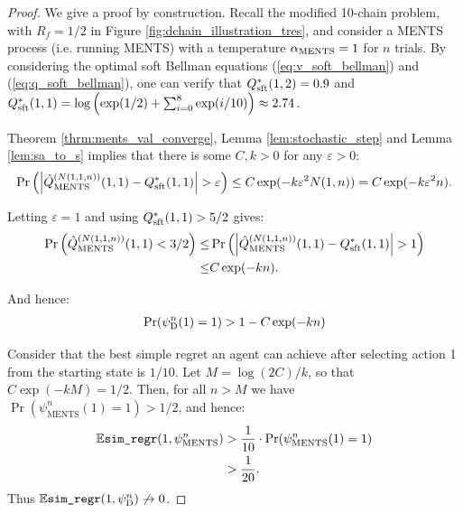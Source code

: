     \begin{proof}
        We give a proof by construction. Recall the modified 10-chain problem, with $R_f=1/2$ in Figure \ref{fig:dchain_illustration_tres}, and consider a MENTS process (i.e. running MENTS) with a temperature ${\alpha_{{\textnormal{MENTS}}}}=1$ for $n$ trials. By considering the optimal soft Bellman equations (\ref{eq:v_soft_bellman}) and (\ref{eq:q_soft_bellman}), one can verify that $Q_{{\textnormal{sft}}}^*(1,2)=0.9$ and $Q_{{\textnormal{sft}}}^*(1,1)=\log\left(\exp(1/2)+\sum_{i=0}^8\exp(i/10)\right)\approx 2.74$. 
        
        Theorem \ref{thrm:ments_val_converge}, Lemma \ref{lem:stochastic_step} and Lemma \ref{lem:sa_to_s} implies that there is some $C,k>0$ for any $\varepsilon > 0$:
        \begin{align}
            \Pr\left(\left| {\hat{Q}^{(N(1,1,n))}_{{\textnormal{MENTS}}}}(1,1) - Q_{{\textnormal{sft}}}^*(1,1)\right| > \varepsilon \right) \leq C\exp(-k\varepsilon^2 N(1,n)) = C\exp(-k\varepsilon^2 n).
        \end{align}
        
        Letting $\varepsilon=1$ and using $Q_{{\textnormal{sft}}}^*(1,1)>5/2$ gives:
        \begin{align}
            \Pr\left({\hat{Q}^{(N(1,1,n))}_{{\textnormal{MENTS}}}}(1,1) < 3/2 \right) 
                \leq& \Pr\left(\left| {\hat{Q}^{(N(1,1,n))}_{{\textnormal{MENTS}}}}(1,1) - Q_{{\textnormal{sft}}}^*(1,1)\right| > 1 \right) \\
                \leq& C\exp(-kn).
        \end{align}
        
        And hence:
        \begin{align}
            \Pr({\psi^{n}_{{\textnormal{D}}}}(1)=1) > 1 - C\exp(-kn)
        \end{align}
        
        Consider that the best simple regret an agent can achieve after selecting action 1 from the starting state is $1/10$. Let $M=\log(2C)/k$, so that $C\exp(-kM)=1/2$. Then, for all $n>M$ we have $\Pr(\psi^n_{\text{MENTS}}(1)=1)> 1/2$, and hence:
        \begin{align}
            \mathbb{E}{\textnormal{\texttt{sim\_regr}}}(1,\psi^{n}_{{\textnormal{MENTS}}}) &> \frac{1}{10} \cdot \Pr(\psi^n_{\text{MENTS}}(1)=1) \\
                &> \frac{1}{20}.
        \end{align}
        Thus $\mathbb{E}{\textnormal{\texttt{sim\_regr}}}(1,{\psi^{n}_{{\textnormal{D}}}})\not\rightarrow 0$.
    \end{proof}






















